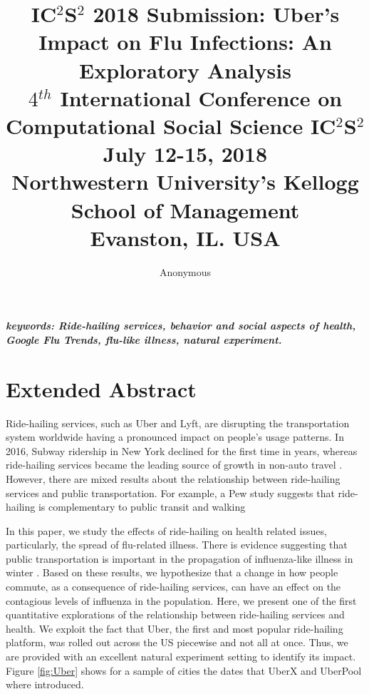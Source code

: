 \documentclass[a4paper,12pt]{article}
\title{IC$^{2}$S$^{2}$ 2018 Submission: Uber's Impact on Flu Infections: An Exploratory Analysis  \\
	\normalsize $4$$^{th}$ International Conference on Computational Social Science IC$^{2}$S$^{2}$ \\
	\normalsize July 12-15, 2018 \\
	\normalsize Northwestern University’s Kellogg School of Management \\
	\normalsize Evanston, IL. USA
}
\author[1]{Anonymous} %
\date{}
\begin{document}
\maketitle

\vspace{-2em}

\begin{center}
\textbf{\textit{keywords: Ride-hailing services, behavior and social aspects of health, Google Flu Trends, flu-like illness, natural experiment.  }}
\newline
\end{center}


\section{Extended Abstract}
Ride-hailing services, such as Uber and Lyft, are disrupting the transportation system worldwide having a pronounced impact on people's usage patterns. In 2016, Subway ridership in New York declined for the first time in years, whereas ride-hailing services became the leading source of growth in non-auto travel \cite{schaller2017unsustainable}. However, there are mixed results about the relationship between ride-hailing services and public transportation. For example, a Pew study suggests that ride-hailing is complementary to public transit and walking %

In this paper, we study the effects of ride-hailing on health related issues, particularly, the spread of flu-related illness. There is evidence suggesting that public transportation is important in the propagation of influenza-like illness in winter \cite{troko2011public,cooley2011role}. Based on these results, we hypothesize that a change in how people commute, as a consequence of ride-hailing services, can have an effect on the contagious levels of influenza in the population. Here, we present one of the first quantitative explorations of the relationship between ride-hailing services and health. We exploit the fact that Uber, the first and most popular ride-hailing platform, was rolled out across the US piecewise and not all at once. Thus, we are provided with an excellent natural experiment setting to identify its impact. Figure \ref{fig:Uber} shows for a sample of cities the dates that UberX and UberPool where introduced.
\end{document}
